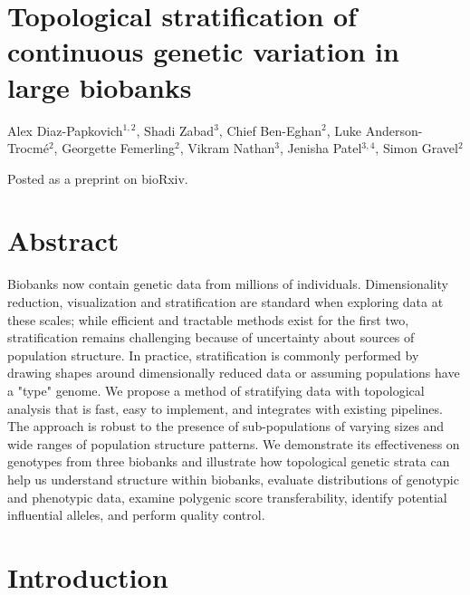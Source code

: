 \section*{Topological stratification of continuous genetic variation in large biobanks}

Alex Diaz-Papkovich$^{1,2}$, Shadi Zabad$^{3}$, Chief Ben-Eghan$^{2}$, Luke Anderson-Trocmé$^{2}$, Georgette Femerling$^{2}$, Vikram Nathan$^{3}$, Jenisha Patel$^{3,4}$, Simon Gravel$^{2}$


Posted as a preprint on bioRxiv.

\section{Abstract}

Biobanks now contain genetic data from millions of individuals. Dimensionality reduction, visualization and stratification are standard when exploring data at these scales; while efficient and tractable methods exist for the first two, stratification remains challenging because of uncertainty about sources of population structure. In practice, stratification is commonly performed by drawing shapes around dimensionally reduced data or assuming populations have a "type" genome. We propose a method of stratifying data with topological analysis that is fast, easy to implement, and integrates with existing pipelines. The approach is robust to the presence of sub-populations of varying sizes and wide ranges of population structure patterns. We demonstrate its effectiveness on genotypes from three biobanks and illustrate how topological genetic strata can help us understand structure within biobanks, evaluate distributions of genotypic and phenotypic data, examine polygenic score transferability, identify potential influential alleles, and perform quality control.

\section{Introduction}

